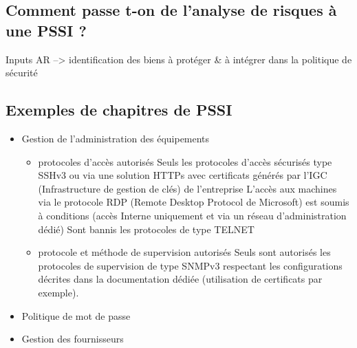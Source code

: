 \subsection{Comment passe t-on de l’analyse de risques à une PSSI ?}

Inputs AR --> identification des biens à protéger \& à intégrer dans la politique de sécurité



\subsection{Exemples de chapitres de PSSI}
\begin{itemize}
    \item Gestion de l’administration des équipements
    \begin{itemize}
        \item protocoles d’accès autorisés
        Seuls les protocoles d'accès sécurisés type SSHv3 ou via une solution HTTPs avec certificats générés par l'IGC (Infrastructure de gestion de clés) de l'entreprise
        L'accès aux machines via le protocole RDP (Remote Desktop Protocol de Microsoft) est soumis à conditions (accès Interne uniquement et via un réseau d'administration dédié)
        Sont bannis les protocoles de type TELNET
        \item protocole et méthode de supervision autorisés
        Seuls sont autorisés les protocoles de supervision de type SNMPv3 respectant les configurations décrites dans la documentation dédiée (utilisation de certificats par exemple).
    \end{itemize}
    \item Politique de mot de passe
    \item Gestion des fournisseurs
\end{itemize}


